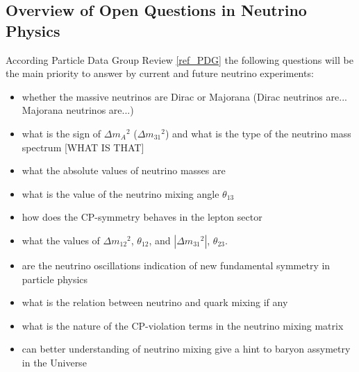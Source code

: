 \subsection{Overview of Open Questions in Neutrino Physics} 
According Particle Data Group Review \ref{ref_PDG} the following questions will be the main priority to answer by current and future neutrino experiments:
\begin{itemize}
  \item whether the massive neutrinos are Dirac or Majorana (Dirac neutrinos are... Majorana neutrinos are...)
  \item what is the sign of $\Delta{m_A}^2$ ($\Delta{m_31}^2$) and what is the type of the neutrino mass spectrum [WHAT IS THAT]
  \item what the absolute values of neutrino masses are
  \item what is the value of the neutrino mixing angle $\theta_{13}$
  \item how does the CP-symmetry behaves in the lepton sector
  \item what the values of $\Delta{m_{12}}^2$, $\theta_{12}$, and $|\Delta{m_{31}}^2|$, $\theta_{23}$.
  \item are the neutrino oscillations indication of new fundamental symmetry in particle physics
  \item what is the relation between neutrino and quark mixing if any
  \item what is the nature of the CP-violation terms in the neutrino mixing matrix
  \item can better understanding of neutrino mixing give a hint to baryon assymetry in the Universe 
\end{itemize}  

